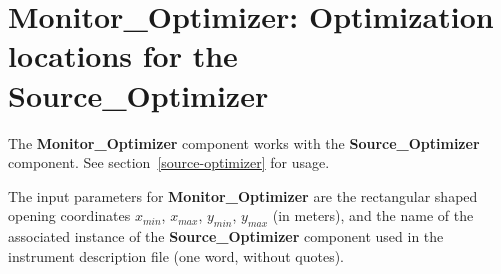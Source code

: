 
\section{Monitor\_Optimizer: Optimization locations for the\\
  Source\_Optimizer}
\label{monitor-optimizer}

The {\bf Monitor\_Optimizer} component works with the {\bf
  Source\_Optimizer} component. See section~\ref{source-optimizer}
for usage.

The input parameters for {\bf Monitor\_Optimizer} are the rectangular
shaped opening coordinates $x_{min}$, $x_{max}$, $y_{min}$,
$y_{max}$ (in meters), and the name of the associated instance of
the {\bf
  Source\_Optimizer} component used in the instrument description file (one word,
without quotes).
